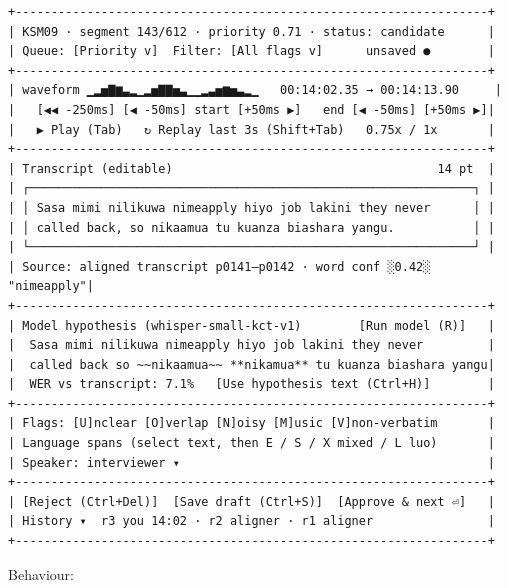 \documentclass[11pt]{article}
\begin{document}
\begin{lstlisting}
+------------------------------------------------------------------+
| KSM09 · segment 143/612 · priority 0.71 · status: candidate      |
| Queue: [Priority v]  Filter: [All flags v]      unsaved ●        |
+------------------------------------------------------------------+
| waveform ▁▂▅▇▆▃▂▁▂▅▇▇▅▃▁▁▂▃▅▆▅▃▂▁   00:14:02.35 → 00:14:13.90     |
|   [◀◀ -250ms] [◀ -50ms] start [+50ms ▶]   end [◀ -50ms] [+50ms ▶]|
|   ▶ Play (Tab)   ↻ Replay last 3s (Shift+Tab)   0.75x / 1x       |
+------------------------------------------------------------------+
| Transcript (editable)                                     14 pt  |
| ┌──────────────────────────────────────────────────────────────┐ |
| │ Sasa mimi nilikuwa nimeapply hiyo job lakini they never      │ |
| │ called back, so nikaamua tu kuanza biashara yangu.           │ |
| └──────────────────────────────────────────────────────────────┘ |
| Source: aligned transcript p0141–p0142 · word conf ░0.42░ "nimeapply"|
+------------------------------------------------------------------+
| Model hypothesis (whisper-small-kct-v1)        [Run model (R)]   |
|  Sasa mimi nilikuwa nimeapply hiyo job lakini they never         |
|  called back so ~~nikaamua~~ **nikamua** tu kuanza biashara yangu|
|  WER vs transcript: 7.1%   [Use hypothesis text (Ctrl+H)]        |
+------------------------------------------------------------------+
| Flags: [U]nclear [O]verlap [N]oisy [M]usic [V]non-verbatim       |
| Language spans (select text, then E / S / X mixed / L luo)       |
| Speaker: interviewer ▾                                           |
+------------------------------------------------------------------+
| [Reject (Ctrl+Del)]  [Save draft (Ctrl+S)]  [Approve & next ⏎]   |
| History ▾  r3 you 14:02 · r2 aligner · r1 aligner                |
+------------------------------------------------------------------+
\end{lstlisting}

Behaviour:
\end{document}
